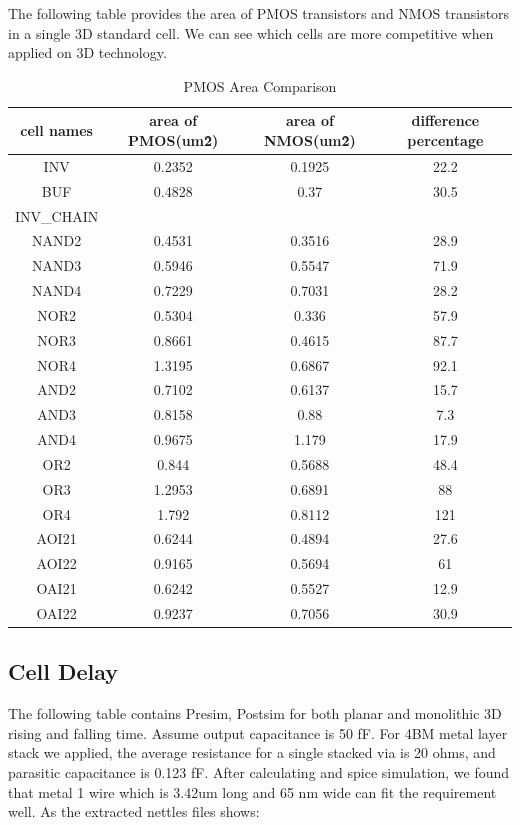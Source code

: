 \documentclass{article}
\begin{document}
The following table provides the area of PMOS transistors and NMOS transistors in a single 3D standard cell. We can see which cells are more competitive when applied on 3D technology.
\begin{table}
\centering
\begin{tabular}{|c|c|c|c|} 
\hline
cell names&area of PMOS(um\^2)&area of NMOS(um\^2)&difference percentage\\ \hline
INV&0.2352&0.1925&22.2\\ \hline
BUF&0.4828&0.37&30.5\\ \hline
INV\_CHAIN&&&\\ \hline
NAND2&0.4531&0.3516&28.9\\ \hline
NAND3&0.5946&0.5547&71.9\\ \hline
NAND4&0.7229&0.7031&28.2\\ \hline
NOR2&0.5304&0.336&57.9\\ \hline
NOR3&0.8661&0.4615&87.7\\ \hline
NOR4&1.3195&0.6867&92.1\\ \hline
AND2&0.7102&0.6137&15.7\\ \hline
AND3&0.8158&0.88&7.3\\ \hline
AND4&0.9675&1.179&17.9\\ \hline
OR2&0.844&0.5688&48.4\\ \hline
OR3&1.2953&0.6891&88\\ \hline
OR4&1.792&0.8112&121\\ \hline
AOI21&0.6244&0.4894&27.6\\ \hline
AOI22&0.9165&0.5694&61\\ \hline
OAI21&0.6242&0.5527&12.9\\ \hline
OAI22&0.9237&0.7056&30.9\\ \hline

\end{tabular}
\caption{PMOS Area Comparison}
\label{tab:pmos_area}
\end{table}
\subsection{Cell Delay}
  The following table contains Presim, Postsim for both planar and monolithic 3D rising and falling time. Assume output capacitance is 50 fF. For 4BM metal layer stack we applied, the average resistance for a single stacked via is 20 ohms, and parasitic capacitance
 is 0.123 fF. After calculating and spice simulation, we found that metal 1 wire which is 3.42um long and 65 nm wide can fit the requirement well. As the extracted nettles files shows:
\end{document}
